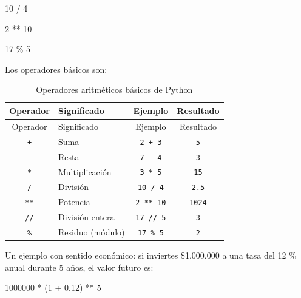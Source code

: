 \documentclass[
  spanish,
  letterpaper,
  DIV=11,
  numbers=noendperiod]{scrreprt}
\newenvironment{Shaded}{\begin{snugshade}}{\end{snugshade}}
\newcommand{\DecValTok}[1]{\textcolor[rgb]{0.68,0.00,0.00}{#1}}
\newcommand{\FloatTok}[1]{\textcolor[rgb]{0.68,0.00,0.00}{#1}}
\newcommand{\NormalTok}[1]{\textcolor[rgb]{0.00,0.23,0.31}{#1}}
\newcommand{\OperatorTok}[1]{\textcolor[rgb]{0.37,0.37,0.37}{#1}}
\begin{document}
\begin{Shaded}
\begin{Highlighting}[]
\DecValTok{10} \OperatorTok{/} \DecValTok{4}
\end{Highlighting}
\end{Shaded}

\begin{Shaded}
\begin{Highlighting}[]
\DecValTok{2} \OperatorTok{**} \DecValTok{10}
\end{Highlighting}
\end{Shaded}

\begin{Shaded}
\begin{Highlighting}[]
\DecValTok{17} \OperatorTok{\%} \DecValTok{5}
\end{Highlighting}
\end{Shaded}

Los operadores básicos son:

\begin{longtable}[]{@{}clcc@{}}
\caption{Operadores aritméticos básicos de
Python}\label{tbl-operadores}\tabularnewline
\toprule\noalign{}
Operador & Significado & Ejemplo & Resultado \\
\midrule\noalign{}
\endfirsthead
\toprule\noalign{}
Operador & Significado & Ejemplo & Resultado \\
\midrule\noalign{}
\endhead
\bottomrule\noalign{}
\endlastfoot
\texttt{+} & Suma & \texttt{2\ +\ 3} & \texttt{5} \\
\texttt{-} & Resta & \texttt{7\ -\ 4} & \texttt{3} \\
\texttt{*} & Multiplicación & \texttt{3\ *\ 5} & \texttt{15} \\
\texttt{/} & División & \texttt{10\ /\ 4} & \texttt{2.5} \\
\texttt{**} & Potencia & \texttt{2\ **\ 10} & \texttt{1024} \\
\texttt{//} & División entera & \texttt{17\ //\ 5} & \texttt{3} \\
\texttt{\%} & Residuo (módulo) & \texttt{17\ \%\ 5} & \texttt{2} \\
\end{longtable}

Un ejemplo con sentido económico: si inviertes \$1.000.000 a una tasa
del 12 \% anual durante 5 años, el valor futuro es:

\begin{Shaded}
\begin{Highlighting}[]
\DecValTok{1000000} \OperatorTok{*}\NormalTok{ (}\DecValTok{1} \OperatorTok{+} \FloatTok{0.12}\NormalTok{) }\OperatorTok{**} \DecValTok{5}
\end{Highlighting}
\end{Shaded}
\end{document}
